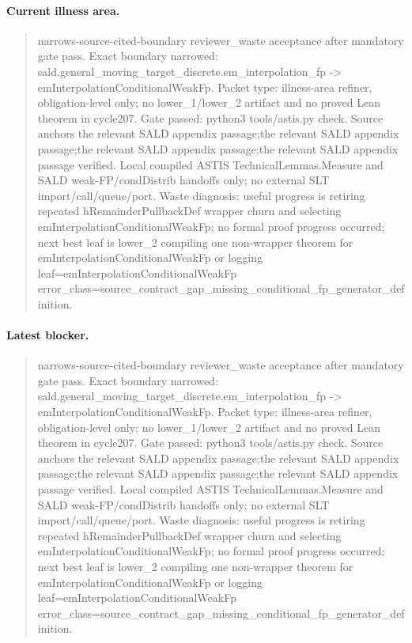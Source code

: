 \paragraph{Current illness area.}
\begin{quote}\small
narrows-source-cited-boundary reviewer\_waste acceptance after mandatory gate pass. Exact boundary narrowed: sald.general\_moving\_target\_discrete.em\_interpolation\_fp -> emInterpolationConditionalWeakFp. Packet type: illness-area refiner, obligation-level only; no lower\_1/lower\_2 artifact and no proved Lean theorem in cycle207. Gate passed: python3 tools/astis.py check. Source anchors the relevant SALD appendix passage;the relevant SALD appendix passage;the relevant SALD appendix passage;the relevant SALD appendix passage verified. Local compiled ASTIS TechnicalLemmas.Measure and SALD weak-FP/condDistrib handoffs only; no external SLT import/call/queue/port. Waste diagnosis: useful progress is retiring repeated hRemainderPullbackDef wrapper churn and selecting emInterpolationConditionalWeakFp; no formal proof progress occurred; next best leaf is lower\_2 compiling one non-wrapper theorem for emInterpolationConditionalWeakFp or logging leaf=emInterpolationConditionalWeakFp error\_class=source\_contract\_gap\_missing\_conditional\_fp\_generator\_definition.
\end{quote}

\paragraph{Latest blocker.}
\begin{quote}\small
narrows-source-cited-boundary reviewer\_waste acceptance after mandatory gate pass. Exact boundary narrowed: sald.general\_moving\_target\_discrete.em\_interpolation\_fp -> emInterpolationConditionalWeakFp. Packet type: illness-area refiner, obligation-level only; no lower\_1/lower\_2 artifact and no proved Lean theorem in cycle207. Gate passed: python3 tools/astis.py check. Source anchors the relevant SALD appendix passage;the relevant SALD appendix passage;the relevant SALD appendix passage;the relevant SALD appendix passage verified. Local compiled ASTIS TechnicalLemmas.Measure and SALD weak-FP/condDistrib handoffs only; no external SLT import/call/queue/port. Waste diagnosis: useful progress is retiring repeated hRemainderPullbackDef wrapper churn and selecting emInterpolationConditionalWeakFp; no formal proof progress occurred; next best leaf is lower\_2 compiling one non-wrapper theorem for emInterpolationConditionalWeakFp or logging leaf=emInterpolationConditionalWeakFp error\_class=source\_contract\_gap\_missing\_conditional\_fp\_generator\_definition.
\end{quote}


